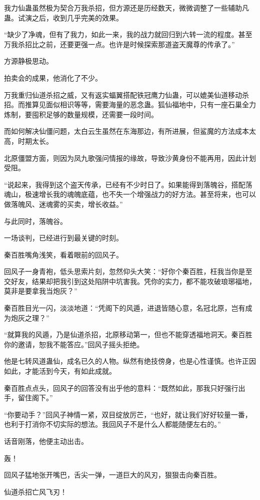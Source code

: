 \begin{this_body}
我力仙蛊虽然极为契合万我杀招，但方源还是历经数天，微微调整了一些辅助凡蛊。试演之后，收到几乎完美的效果。

“缺少了净魂，但有了我力，如此一来，我的战力就回归到六转一流的程度。甚至万我杀招比之前，还要更强一点。也许是时候探索那道盗天魔尊的传承了。”

方源静极思动。

拍卖会的成果，他消化了不少。

万我重归仙道杀招之威，又有返实蝠翼搭配铁冠鹰力仙蛊，可以媲美仙道移动杀招。而推算见面似相识等等，需要海量的恶念蛊。狐仙福地中，只有一座石巢全力炼制，要囤积足够的数量规模，还需要一段时间。

而如何解决仙僵问题，太白云生虽然在东海那边，有所进展，但鲨魔的方法成本太高，时期太长。

北原僵盟方面，则因为凤九歌强问情报的缘故，导致沙黄身份不能再用，因此计划受阻。

“说起来，我得到这个盗天传承，已经有不少时日了。如果能得到落魄谷，搭配荡魂山，极速增长我的魂魄底蕴，也不失一个增强战力的好方法。甚至将来，也可以做落魄风、迷魂雾的买卖，增长收益。”

与此同时，落魄谷。

一场谈判，已经进行到最关键的时刻。

秦百胜嘴角浅笑，看着眼前的回风子。

回风子一身青袍，低头思索片刻，忽然仰头大笑：“好你个秦百胜，枉我当你是至交好友，结果却把我引到这处陷阱中坑害我。凭你的实力，都不能攻破琅琊福地，莫非是要拿我当炮灰？”

秦百胜目光一闪，淡淡地道：“凭阁下的风遁，进退皆随心意，名冠北原，岂有成为炮灰之理？”

“就算我的风遁，乃是仙道杀招，北原移动第一，但也不能穿透福地洞天。秦百胜你的邀请，恕我不能答应。”回风子摇头拒绝。

他是七转风道蛊仙，成名已久的人物。纵然有绝技傍身，也是心性谨慎。也许正因如此，才能活到今天，有如此成就。

秦百胜点点头，回风子的回答没有出乎他的意料：“既然如此，那我只好强行出手，留住阁下。”

“你要动手？”回风子神情一紧，双目绽放厉芒，“也好，就让我们好好较量一番，也利于打消你不切实际的想法。我回风子不是什么人都能随便左右的。”

话音刚落，他便主动出击。

轰！

回风子猛地张开嘴巴，舌尖一弹，一道巨大的风刃，狠狠击向秦百胜。

仙道杀招亡风飞刃！


\end{this_body}
